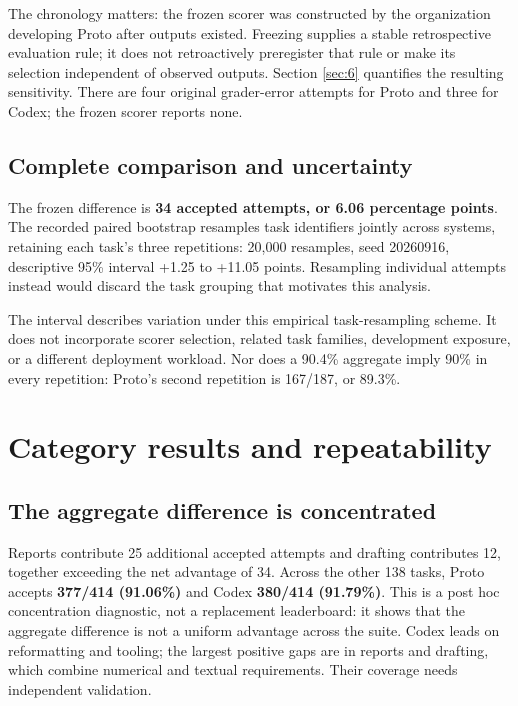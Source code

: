 The chronology matters: the frozen scorer was constructed by the organization developing Proto after outputs existed. Freezing supplies a stable retrospective evaluation rule; it does not retroactively preregister that rule or make its selection independent of observed outputs. Section \ref{sec:6} quantifies the resulting sensitivity. There are four original grader-error attempts for Proto and three for Codex; the frozen scorer reports none.

\subsection{Complete comparison and uncertainty}\label{complete-comparison-and-uncertainty}



The frozen difference is \textbf{34 accepted attempts, or 6.06 percentage points}. The recorded paired bootstrap resamples task identifiers jointly across systems, retaining each task's three repetitions: 20,000 resamples, seed 20260916, descriptive 95\% interval +1.25 to +11.05 points. Resampling individual attempts instead would discard the task grouping that motivates this analysis.

The interval describes variation under this empirical task-resampling scheme. It does not incorporate scorer selection, related task families, development exposure, or a different deployment workload. Nor does a 90.4\% aggregate imply 90\% in every repetition: Proto's second repetition is 167/187, or 89.3\%.

\section{Category results and repeatability}\label{sec:4}

\subsection{The aggregate difference is concentrated}\label{the-aggregate-difference-is-concentrated}



Reports contribute 25 additional accepted attempts and drafting contributes 12, together exceeding the net advantage of 34. Across the other 138 tasks, Proto accepts \textbf{377/414 (91.06\%)} and Codex \textbf{380/414 (91.79\%)}. This is a post hoc concentration diagnostic, not a replacement leaderboard: it shows that the aggregate difference is not a uniform advantage across the suite. Codex leads on reformatting and tooling; the largest positive gaps are in reports and drafting, which combine numerical and textual requirements. Their coverage needs independent validation.

